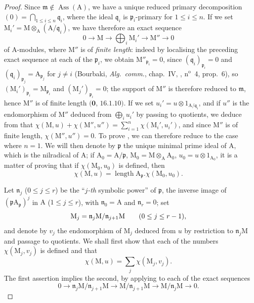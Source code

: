 \begin{proof}
Since $\mathfrak{m}\notin\operatorname{Ass}(\mathrm{A})$, we have a unique reduced primary decomposition $(0)=\bigcap_{1\leq i\leq n}\mathfrak{q}_i$, where the ideal $\mathfrak{q}_i$ is $\mathfrak{p}_i$-primary for $1\leq i\leq n$.
If we set $\mathrm{M}_i'=\mathrm{M}\otimes_{\mathrm{A}}(\mathrm{A}/\mathfrak{q}_i)$, we have therefore an exact sequence
\[
  0\to\mathrm{M}\to\bigoplus_i\mathrm{M}_i'\to\mathrm{M}''\to 0
\]
of A-modules, where $\mathrm{M}''$ is of \emph{finite length}: indeed by localising the preceding exact sequence at each of the $\mathfrak{p}_i$, we obtain $\mathrm{M}''_{\mathfrak{p}_i}=0$, since $(\mathfrak{q}_i)_{\mathfrak{p}_i}=0$ and $(\mathfrak{q}_i)_{\mathfrak{p}_j}=\mathrm{A}_{\mathfrak{p}_j}$ for $j\neq i$ (Bourbaki, \emph{Alg.\ comm.}, chap.~IV, , n$^{\mathrm{o}}$~4, prop.~6), so $(\mathrm{M}_i')_{\mathfrak{p}_i}=\mathrm{M}_{\mathfrak{p}_i}$ and $(\mathrm{M}_j')_{\mathfrak{p}_i}=0$;
the support of $\mathrm{M}''$ is therefore reduced to $\mathfrak{m}$, hence $\mathrm{M}''$ is of finite length $(\mathbf{0}$, $16.1.10)$.
If we set $u_i'=u\otimes 1_{\mathrm{A}/\mathfrak{q}_i}$, and if $u''$ is the endomorphism of $\mathrm{M}''$ deduced from $\bigoplus_i u_i'$ by passing to quotients, we deduce from  that $\chi(\mathrm{M},u)+\chi(\mathrm{M}'',u'')=\sum_{i=1}^n\chi(\mathrm{M}_i',u_i')$, and since $\mathrm{M}''$ is of finite length, $\chi(\mathrm{M}'',u'')=0$.
To prove , we can therefore reduce to the case where $n=1$.
We will then denote by $\mathfrak{p}$ the unique minimal prime ideal of $\mathrm{A}$, which is the nilradical of $\mathrm{A}$; if $\mathrm{A}_0=\mathrm{A}/\mathfrak{p}$, $\mathrm{M}_0=\mathrm{M}\otimes_{\mathrm{A}}\mathrm{A}_0$, $u_0=u\otimes 1_{\mathrm{A}_0}$, it is a matter of proving that if $\chi(\mathrm{M}_0,u_0)$ is defined, then
\[
\label{IV.21.10.17.9}
  \chi(\mathrm{M},u)=\operatorname{length}\mathrm{A}_{\mathfrak{p}}.\chi(\mathrm{M}_0,u_0).
  \tag{21.10.17.9}
\]

Let $\mathfrak{n}_j$ ($0\leq j\leq r$) be the ``\emph{$j$-th} symbolic power'' of $\mathfrak{p}$, the inverse image of $(\mathfrak{p}\mathrm{A}_{\mathfrak{p}})^j$ in $\mathrm{A}$ ($1\leq j\leq r$), with $\mathfrak{n}_0=\mathrm{A}$ and $\mathfrak{n}_r=0$; set
\[
  \mathrm{M}_j=\mathfrak{n}_j\mathrm{M}/\mathfrak{n}_{j+1}\mathrm{M}\qquad(0\leq j\leq r- 1),
\]
and denote by $v_j$ the endomorphism of $\mathrm{M}_j$ deduced from $u$ by restriction to $\mathfrak{n}_j\mathrm{M}$ and passage to quotients.
We shall first show that each of the numbers $\chi(\mathrm{M}_j,v_j)$ is defined and that
\[
\label{IV.21.10.17.10}
  \chi(\mathrm{M},u)=\sum_j\chi(\mathrm{M}_j,v_j).
  \tag{21.10.17.10}
\]
The first assertion implies the second, by applying  to each of the exact sequences
\[
  0\to\mathfrak{n}_j\mathrm{M}/\mathfrak{n}_{j+1}\mathrm{M}\to\mathrm{M}/\mathfrak{n}_{j+1}\mathrm{M}\to\mathrm{M}/\mathfrak{n}_j\mathrm{M}\to 0.
\]


\end{proof}
